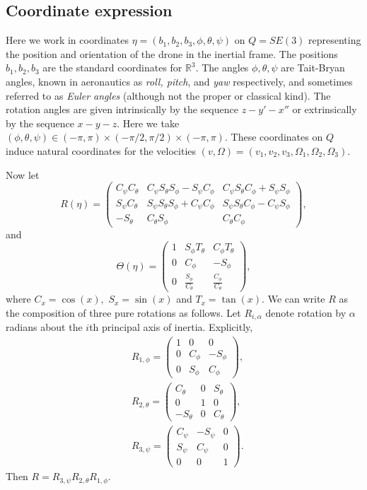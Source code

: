 \documentclass{aims}
\theoremstyle{definition}
\begin{document}
\subsection{Coordinate expression}
\label{subsec: coord expr}
Here we work in coordinates $\eta=(b_1, b_2, b_3, \phi, \theta, \psi)$ on $Q=SE(3)$ representing the position and orientation of the drone in the inertial frame.  The positions $b_1, b_2, b_3$ are the standard coordinates for $\mathbb R^3$.
The angles $ \phi, \theta, \psi$ are Tait-Bryan angles, known in aeronautics as \textit{roll, pitch}, and \textit{yaw} respectively, and sometimes referred to as \textit{Euler angles} (although not the proper or classical kind).  The rotation angles are given intrinsically by the sequence $z-y'-x''$  or extrinsically by the sequence $x-y-z$.  %
Here we take $(\phi, \theta, \psi) \in (-\pi, \pi)\times (-\pi/2, \pi/2) \times (-\pi, \pi) .$  These coordinates on $Q$ induce natural coordinates for the velocities $(v,\Omega)=(v_1, v_2, v_3,\Omega_1, \Omega_2, \Omega_3)$.

Now let
$$
R(\eta) = \begin{pmatrix}
        C_\psi C_\theta & C_\psi S_\theta S_\phi - S_\psi C_\phi & C_\psi S_\theta C_\phi + S_\psi S_\phi\\
        S_\psi C_\theta & S_\psi S_\theta S_\phi + C_\psi C_\phi & S_\psi S_\theta C_\phi - C_\psi S_\phi\\
        -S_\theta & C_\theta S_\phi & C_\theta C_\phi
    \end{pmatrix},
    $$
and
    $$\Theta(\eta)=\begin{pmatrix}1&S_\phi T_\theta&C_\phi T_\theta\\0&C_\phi&-S_\phi\\0&\frac{S_\phi}{C_\theta}&\frac{C_\phi}{C_\theta}\end{pmatrix},$$
    where $C_x=\cos(x),$ $S_x=\sin(x)$ and $T_x=\tan(x)$.
We can write $R$ as the composition of three pure rotations as follows.  Let $R_{i, \alpha}$ denote rotation by $\alpha$ radians about the $i$th principal axis of inertia.
Explicitly,  
\begin{align*}
&R_{1, \phi} = 
\begin{pmatrix}
        1 & 0 & 0 \\
        0 &  C_\phi & -S_\phi\\
        0 & S_\phi & C_\phi 
    \end{pmatrix},
\\
    &R_{2, \theta} = 
\begin{pmatrix}
        C_\theta & 0 & S_\theta \\
        0 & 1 & 0 \\
        -S_\theta & 0 & C_\theta
    \end{pmatrix},
\\
    &R_{3, \psi} = 
\begin{pmatrix}
        C_\psi & -S_\psi & 0 \\
        S_\psi & C_\psi & 0 \\
        0 & 0 & 1
    \end{pmatrix}.
\end{align*}
Then $R=   R_{3, \psi}    R_{2, \theta}  R_{1, \phi} $.
\end{document}
